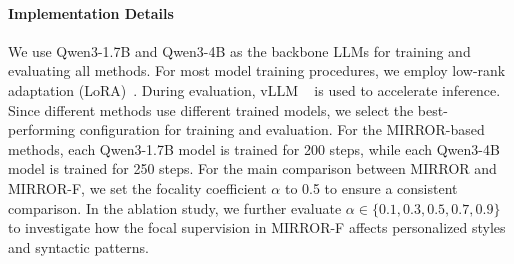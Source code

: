\documentclass{article} %
\begin{document}
\paragraph{Implementation Details} We use Qwen3-1.7B and Qwen3-4B as the backbone LLMs for training and evaluating all methods. For most model training procedures, we employ low-rank adaptation (LoRA)~\citep{lora}. During evaluation, vLLM ~\citep{vllm} is used to accelerate inference. Since different methods use different trained models, we select the best-performing configuration for training and evaluation. For the MIRROR-based methods, each Qwen3-1.7B model is trained for 200 steps, while each Qwen3-4B model is trained for 250 steps. For the main comparison between MIRROR and MIRROR-F, we set the focality coefficient $\alpha$ to 0.5 to ensure a consistent comparison. In the ablation study, we further evaluate $\alpha \in \{0.1, 0.3, 0.5, 0.7, 0.9\}$ to investigate how the focal supervision in MIRROR-F affects personalized styles and syntactic patterns.
\end{document}
